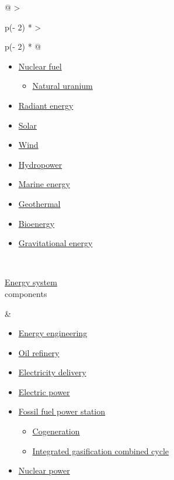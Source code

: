 \documentclass[
]{article}
\providecommand{\tightlist}{%
  \setlength{\itemsep}{0pt}\setlength{\parskip}{0pt}}
\newenvironment{LTR}{\beginL}{\endL}
\begin{document}
\begin{LTR}
\begin{otherlanguage}{english}
\begin{longtable}[]{@{}
  >{\raggedright\arraybackslash}p{(\columnwidth - 2\tabcolsep) * }
  >{\raggedright\arraybackslash}p{(\columnwidth - 2\tabcolsep) * }@{}}
\begin{minipage}[t]{\linewidth}
\begin{itemize}
  \begin{itemize}
  \tightlist
  \item
    \href{/wiki/Coal}{Coal}
  \item
    \href{/wiki/Petroleum}{Petroleum}
  \item
    \href{/wiki/Natural_gas}{Natural gas}
  \end{itemize}
\item
  \href{/wiki/Nuclear_fuel}{Nuclear fuel}

  \begin{itemize}
  \tightlist
  \item
    \href{/wiki/Natural_uranium}{Natural uranium}
  \end{itemize}
\item
  \href{/wiki/Radiant_energy}{Radiant energy}
\item
  \href{/wiki/Solar_energy}{Solar}
\item
  \href{/wiki/Wind_energy}{Wind}
\item
  \href{/wiki/Hydropower}{Hydropower}
\item
  \href{/wiki/Marine_energy}{Marine energy}
\item
  \href{/wiki/Geothermal_energy}{Geothermal}
\item
  \href{/wiki/Bioenergy}{Bioenergy}
\item
  \href{/wiki/Gravitational_energy}{Gravitational energy}
\end{itemize}
\end{minipage} \\
\begin{minipage}[t]{\linewidth}\raggedright
\href{/wiki/Energy_system}{Energy system}\\
components\strut
\end{minipage} & \begin{minipage}[t]{\linewidth}\raggedright
\begin{itemize}
\tightlist
\item
  \href{/wiki/Energy_engineering}{Energy engineering}
\item
  \href{/wiki/Oil_refinery}{Oil refinery}
\item
  \href{/wiki/Electricity_delivery}{Electricity delivery}
\item
  \href{/wiki/Electric_power}{Electric power}
\item
  \href{/wiki/Fossil_fuel_power_station}{Fossil fuel power station}

  \begin{itemize}
  \tightlist
  \item
    \href{/wiki/Cogeneration}{Cogeneration}
  \item
    \href{/wiki/Integrated_gasification_combined_cycle}{Integrated
    gasification combined cycle}
  \end{itemize}
\item
  \href{/wiki/Nuclear_power}{Nuclear power}


\end{itemize}
\end{minipage}
\end{longtable}
\end{otherlanguage}
\end{LTR}
\end{document}

